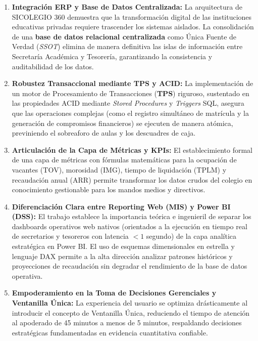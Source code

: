 \documentclass[12pt,a4paper,oneside]{report}
\begin{document}
\begin{enumerate}
    \item \textbf{Integración ERP y Base de Datos Centralizada:} La arquitectura de SICOLEGIO 360 demuestra que la transformación digital de las instituciones educativas privadas requiere trascender los sistemas aislados. La consolidación de una \textbf{base de datos relacional centralizada} como Única Fuente de Verdad (\textit{SSOT}) elimina de manera definitiva las islas de información entre Secretaría Académica y Tesorería, garantizando la consistencia y auditabilidad de los datos.
    \item \textbf{Robustez Transaccional mediante TPS y ACID:} La implementación de un motor de Procesamiento de Transacciones (\textbf{TPS}) riguroso, sustentado en las propiedades ACID mediante \textit{Stored Procedures} y \textit{Triggers} SQL, asegura que las operaciones complejas (como el registro simultáneo de matrícula y la generación de compromisos financieros) se ejecuten de manera atómica, previniendo el sobreaforo de aulas y los descuadres de caja.
    \item \textbf{Articulación de la Capa de Métricas y KPIs:} El establecimiento formal de una capa de métricas con fórmulas matemáticas para la ocupación de vacantes ($\text{TOV}$), morosidad ($\text{IMG}$), tiempo de liquidación ($\text{TPLM}$) y recaudación anual ($\text{ARR}$) permite transformar los datos crudos del colegio en conocimiento gestionable para los mandos medios y directivos.
    \item \textbf{Diferenciación Clara entre Reporting Web (MIS) y Power BI (DSS):} El trabajo establece la importancia teórica e ingenieril de separar los dashboards operativos web nativos (orientados a la ejecución en tiempo real de secretarios y tesoreros con latencia $<1$ segundo) de la capa analítica estratégica en Power BI. El uso de esquemas dimensionales en estrella y lenguaje DAX permite a la alta dirección analizar patrones históricos y proyecciones de recaudación sin degradar el rendimiento de la base de datos operativa.
    \item \textbf{Empoderamiento en la Toma de Decisiones Gerenciales y Ventanilla Única:} La experiencia del usuario se optimiza drásticamente al introducir el concepto de Ventanilla Única, reduciendo el tiempo de atención al apoderado de 45 minutos a menos de 5 minutos, respaldando decisiones estratégicas fundamentadas en evidencia cuantitativa confiable.
\end{enumerate}
\end{document}

